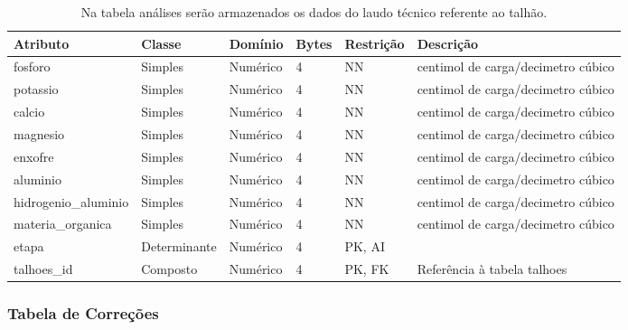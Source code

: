 \begin{landscape}
    \begin{table}[H]
        \centering
        \caption[Tabela \textbf{análises}]{Na tabela análises serão armazenados os dados do laudo técnico referente ao talhão.
            \label{tab:tabela-er-analises}}
        \begin{tabular}{|p{4cm}|p{3cm}|p{2cm}|p{1cm}|p{2cm}|p{8cm}|}
            \hline
            Atributo             & Classe       & Domínio  & Bytes & Restrição & Descrição                          \\\hline
            fosforo              & Simples      & Numérico & 4     & NN        & centimol de carga/decimetro cúbico \\\hline
            potassio             & Simples      & Numérico & 4     & NN        & centimol de carga/decimetro cúbico \\\hline
            calcio               & Simples      & Numérico & 4     & NN        & centimol de carga/decimetro cúbico \\\hline
            magnesio             & Simples      & Numérico & 4     & NN        & centimol de carga/decimetro cúbico \\\hline
            enxofre              & Simples      & Numérico & 4     & NN        & centimol de carga/decimetro cúbico \\\hline
            aluminio             & Simples      & Numérico & 4     & NN        & centimol de carga/decimetro cúbico \\\hline
            hidrogenio\_aluminio & Simples      & Numérico & 4     & NN        & centimol de carga/decimetro cúbico \\\hline
            materia\_organica    & Simples      & Numérico & 4     & NN        & centimol de carga/decimetro cúbico \\\hline
            etapa                & Determinante & Numérico & 4     & PK, AI    &                                    \\\hline
            talhoes\_id          & Composto     & Numérico & 4     & PK, FK    & Referência à tabela talhoes        \\\hline
        \end{tabular}
    \end{table}

    \subsubsection{Tabela de Correções}
    \label{sec:titSubSecAnalises}


\end{landscape}
